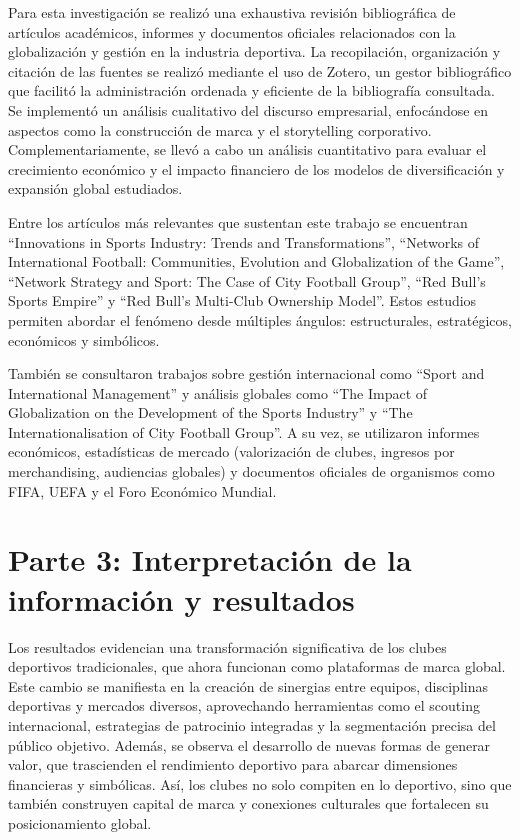 \documentclass[12pt,a4paper]{article}
\begin{document}
Para esta investigación se realizó una exhaustiva revisión bibliográfica de artículos académicos, informes y documentos oficiales relacionados con la globalización y gestión en la industria deportiva. La recopilación, organización y citación de las fuentes se realizó mediante el uso de Zotero, un gestor bibliográfico que facilitó la administración ordenada y eficiente de la bibliografía consultada. Se implementó un análisis cualitativo del discurso empresarial, enfocándose en aspectos como la construcción de marca y el storytelling corporativo. Complementariamente, se llevó a cabo un análisis cuantitativo para evaluar el crecimiento económico y el impacto financiero de los modelos de diversificación y expansión global estudiados.

Entre los artículos más relevantes que sustentan este trabajo se encuentran “Innovations in Sports Industry: Trends and Transformations”, “Networks of International Football: Communities, Evolution and Globalization of the Game”, “Network Strategy and Sport: The Case of City Football Group”, “Red Bull’s Sports Empire” y “Red Bull’s Multi-Club Ownership Model”. Estos estudios permiten abordar el fenómeno desde múltiples ángulos: estructurales, estratégicos, económicos y simbólicos.

También se consultaron trabajos sobre gestión internacional como “Sport and International Management” y análisis globales como “The Impact of Globalization on the Development of the Sports Industry” y “The Internationalisation of City Football Group”. A su vez, se utilizaron informes económicos, estadísticas de mercado (valorización de clubes, ingresos por merchandising, audiencias globales) y documentos oficiales de organismos como FIFA, UEFA y el Foro Económico Mundial.


\section{Parte 3: Interpretación de la información y resultados}
Los resultados evidencian una transformación significativa de los clubes deportivos tradicionales, que ahora funcionan como plataformas de marca global. Este cambio se manifiesta en la creación de sinergias entre equipos, disciplinas deportivas y mercados diversos, aprovechando herramientas como el scouting internacional, estrategias de patrocinio integradas y la segmentación precisa del público objetivo.
Además, se observa el desarrollo de nuevas formas de generar valor, que trascienden el rendimiento deportivo para abarcar dimensiones financieras y simbólicas. Así, los clubes no solo compiten en lo deportivo, sino que también construyen capital de marca y conexiones culturales que fortalecen su posicionamiento global.
\end{document}
